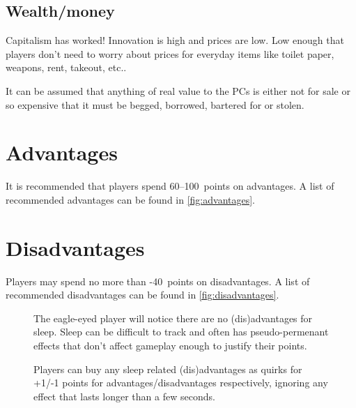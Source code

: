 \subsection{Wealth/money}
Capitalism has worked! Innovation is high and prices are low. Low enough that 
players don't need to worry about prices for everyday items like toilet paper,
weapons, rent, takeout, etc..

It can be assumed that anything of real value to the PCs is either
not for sale or so expensive that it must be begged, borrowed, bartered for or
stolen.


\section{Advantages}
\label{sec:advantages}

It is recommended that players spend 60--100~points on advantages. A list of
recommended advantages can be found in \autoref{fig:advantages}.

\section{Disadvantages}
\label{sec:disadvantages}

Players may spend no more than -40~points on disadvantages. A list of
recommended disadvantages can be found in \autoref{fig:disadvantages}.




\begin{figure}[b]
  \centering
  \begin{tcolorbox}[title={Where are the sleep (dis)advantages?}]
    The eagle-eyed player will notice there are no (dis)advantages for sleep.
    Sleep can be difficult to track and often has pseudo-permenant effects that
    don't affect gameplay enough to justify their points.

    Players can buy any sleep related (dis)advantages as quirks for +1/-1 points for
    advantages/disadvantages respectively, ignoring any effect that lasts longer
    than a few seconds.
    
  \end{tcolorbox}
\end{figure}


